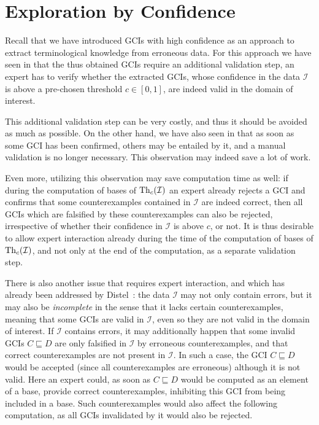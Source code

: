 \chapter{Exploration by Confidence}
\label{cha:expl-conf}

Recall that we have introduced GCIs with high confidence as an approach to extract
terminological knowledge from erroneous data.  For this approach we have seen in
 that the thus obtained GCIs require an additional validation
step, \ie an expert has to verify whether the extracted GCIs, whose confidence in the data
$\mathcal{I}$ is above a pre-chosen threshold $c \in [0,1]$, are indeed valid in the
domain of interest.

This additional validation step can be very costly, and thus it should be avoided as much
as possible.  On the other hand, we have also seen in  that as
soon as some GCI has been confirmed, others may be entailed by it, and a manual validation
is no longer necessary.  This observation may indeed save a lot of work.

Even more, utilizing this observation may save computation time as well: if during the
computation of bases of $\operatorname{Th}_c(\mathcal{I})$ an expert already rejects a GCI and confirms
that some counterexamples contained in $\mathcal{I}$ are indeed correct, then all GCIs
which are falsified by these counterexamples can also be rejected, irrespective of whether
their confidence in $\mathcal{I}$ is above $c$, or not.  It is thus desirable to allow
expert interaction already during the time of the computation of bases of
$\operatorname{Th}_c(\mathcal{I})$, and not only at the end of the computation, as a separate validation
step.

There is also another issue that requires expert interaction, and which has already been
addressed by Distel~\cite{Diss-Felix}: the data $\mathcal{I}$ may not only contain errors,
but it may also be \emph{incomplete} in the sense that it lacks certain counterexamples,
meaning that some GCIs are valid in $\mathcal{I}$, even so they are not valid in the
domain of interest.  If $\mathcal{I}$ contains errors, it may additionally happen that
some invalid GCIs $C \sqsubseteq D$ are only falsified in $\mathcal{I}$ by erroneous
counterexamples, and that correct counterexamples are not present in $\mathcal{I}$.  In
such a case, the GCI $C \sqsubseteq D$ would be accepted (since all counterexamples are
erroneous) although it is not valid.  Here an expert could, as soon as $C \sqsubseteq D$
would be computed as an element of a base, provide correct counterexamples, inhibiting
this GCI from being included in a base.  Such counterexamples would also affect the
following computation, as all GCIs invalidated by it would also be rejected.

